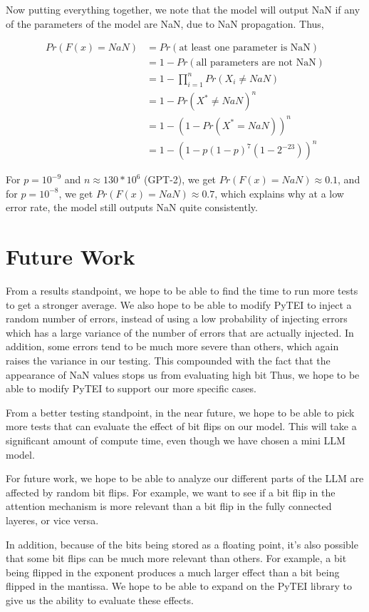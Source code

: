 \documentclass[a4paper]{article}
\begin{document}
Now putting everything together, we note that the model will output NaN if any of the parameters of the model are NaN, due to NaN propagation. Thus,

\begin{align*}
	Pr(F(x) = NaN) &= Pr(\text{at least one parameter is NaN}) \\
	&= 1 - Pr(\text{all parameters are not NaN}) \\
	&= 1 - \prod_{i=1}^n Pr(X_i \neq NaN) \\
	&= 1 - Pr(X^* \neq NaN)^n \\
	&= 1 - (1 - Pr(X^* = NaN))^n \\
	&= 1 - (1 - p(1 - p)^7(1 - 2^{-23}))^n
\end{align*}

For $p = 10^{-9}$ and $n \approx 130 * 10^6$ (GPT-2), we get $Pr(F(x) = NaN) \approx 0.1$, and for $p = 10^{-8}$, we get $Pr(F(x) = NaN) \approx 0.7$, which explains why at a low error rate, the model still outputs NaN quite consistently.

\section{Future Work}

From a results standpoint, we hope to be able to find the time to run more tests to get a stronger average. We also hope to be able to modify PyTEI to inject a random number of errors, instead of using a low probability of injecting errors which has a large variance of the number of errors that are actually injected. In addition, some errors tend to be much more severe than others, which again raises the variance in our testing. This compounded with the fact that the appearance of NaN values stops us from evaluating high bit Thus, we hope to be able to modify PyTEI to support our more specific cases.

From a better testing standpoint, in the near future, we hope to be able to pick more tests that can evaluate the effect of bit flips on our model. This will take a significant amount of compute time, even though we have chosen a mini LLM model.

For future work, we hope to be able to analyze our different parts of the LLM are affected by random bit flips. For example, we want to see if a bit flip in the attention mechanism is more relevant than a bit flip in the fully connected layeres, or vice versa. 

In addition, because of the bits being stored as a floating point, it's also possible that some bit flips can be much more relevant than others. For example, a bit being flipped in the exponent produces a much larger effect than a bit being flipped in the mantissa. We hope to be able to expand on the PyTEI library to give us the ability to evaluate these effects.
\end{document}
